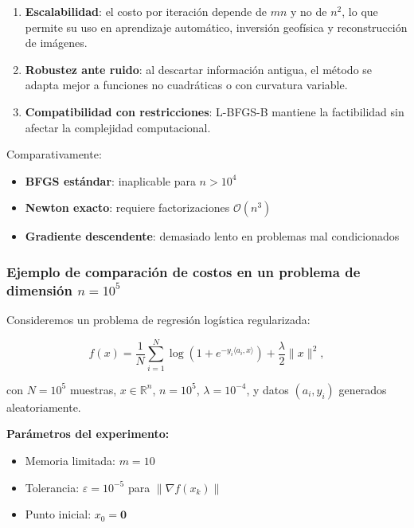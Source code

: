 \documentclass[
  spanish,
  us-letterpaper,
  DIV=11,
  numbers=noendperiod]{scrreprt}
\providecommand{\tightlist}{%
  \setlength{\itemsep}{0pt}\setlength{\parskip}{0pt}}
\numberwithin{equation}{section}
\begin{document}
\begin{enumerate}
\def\labelenumi{\arabic{enumi}.}
\tightlist
\item
  \textbf{Escalabilidad}: el costo por iteración depende de \(mn\) y no
  de \(n^2\), lo que permite su uso en aprendizaje automático, inversión
  geofísica y reconstrucción de imágenes.\\
\item
  \textbf{Robustez ante ruido}: al descartar información antigua, el
  método se adapta mejor a funciones no cuadráticas o con curvatura
  variable.\\
\item
  \textbf{Compatibilidad con restricciones}: L-BFGS-B mantiene la
  factibilidad sin afectar la complejidad computacional.
\end{enumerate}

Comparativamente:

\begin{itemize}
\tightlist
\item
  \textbf{BFGS estándar}: inaplicable para \(n > 10^4\)\\
\item
  \textbf{Newton exacto}: requiere factorizaciones
  \(\mathcal{O}(n^3)\)\\
\item
  \textbf{Gradiente descendente}: demasiado lento en problemas mal
  condicionados
\end{itemize}

\subsubsection{\texorpdfstring{Ejemplo de comparación de costos en un
problema de dimensión
\(n = 10^5\)}{Ejemplo de comparación de costos en un problema de dimensión n = 10\^{}5}}\label{ejemplo-de-comparaciuxf3n-de-costos-en-un-problema-de-dimensiuxf3n-n-105}

Consideremos un problema de regresión logística regularizada:

\[
f(x) = \frac{1}{N} \sum_{i=1}^N \log(1 + e^{-y_i \langle a_i, x \rangle}) 
+ \frac{\lambda}{2} \|x\|^2,
\tag{3.121}
\]

con \(N = 10^5\) muestras, \(x \in \mathbb{R}^n\), \(n = 10^5\),
\(\lambda = 10^{-4}\), y datos \((a_i, y_i)\) generados aleatoriamente.

\textbf{Parámetros del experimento:}

\begin{itemize}
\tightlist
\item
  Memoria limitada: \(m = 10\)\\
\item
  Tolerancia: \(\varepsilon = 10^{-5}\) para \(\|\nabla f(x_k)\|\)\\
\item
  Punto inicial: \(x_0 = \mathbf{0}\)
\end{itemize}
\end{document}
